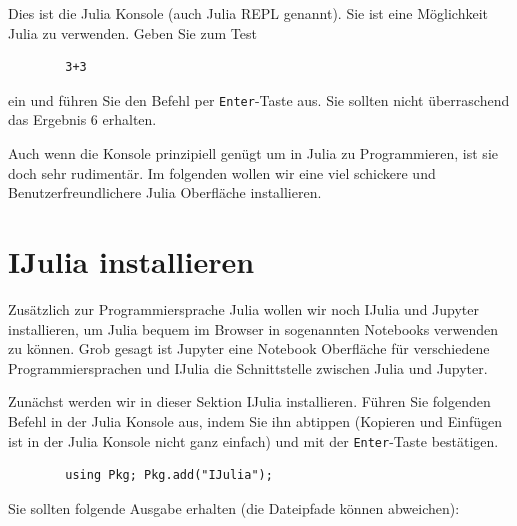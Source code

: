 \documentclass[11pt, a4paper]{scrartcl}
\begin{document}
	Dies ist die Julia Konsole (auch Julia REPL genannt). Sie ist eine Möglichkeit Julia zu verwenden. Geben Sie zum Test
	
	\begin{lstlisting}
		3+3
	\end{lstlisting}
	
	ein und führen Sie den Befehl per \texttt{Enter}-Taste aus. Sie sollten nicht überraschend das Ergebnis 6 erhalten.
	
	\vspace{1cm}
	
	Auch wenn die Konsole prinzipiell genügt um in Julia zu Programmieren, ist sie doch sehr rudimentär. Im folgenden wollen wir eine viel schickere und Benutzerfreundlichere Julia Oberfläche installieren.
	
	
	
	
	
	
	
	
	
	
	
	\newpage
	\section{IJulia installieren}
	
	Zusätzlich zur Programmiersprache Julia wollen wir noch IJulia und Jupyter installieren, um Julia bequem im Browser in sogenannten Notebooks verwenden zu können. Grob gesagt ist Jupyter eine Notebook Oberfläche für verschiedene Programmiersprachen und IJulia die Schnittstelle zwischen Julia und Jupyter. 
	
	
	Zunächst werden wir in dieser Sektion IJulia installieren. Führen Sie folgenden Befehl in der Julia Konsole aus, indem Sie ihn abtippen (Kopieren und Einfügen ist in der Julia Konsole nicht ganz einfach) und mit der \texttt{Enter}-Taste bestätigen.
	
	\begin{lstlisting}
		using Pkg; Pkg.add("IJulia");
	\end{lstlisting}

	Sie sollten folgende Ausgabe erhalten (die Dateipfade können abweichen):
	
\end{document}
